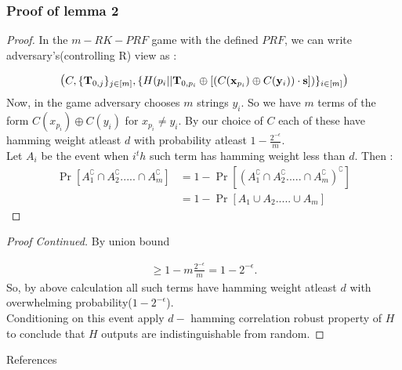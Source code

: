 \documentclass[hyperref={pdfpagelabels=false}]{beamer}
\theoremstyle{remark}
\begin{document}
\begin{frame}
\frametitle{Proof of lemma 2}
\begin{proof}\renewcommand{\qedsymbol}{}
In the $m-RK-PRF$ game with the defined $PRF$, we can write adversary's(controlling R) view as : 

\begin{equation}
\mathlarger{(} C, \{\mathbf{T}_{0,j}\}_{j \in [m]}, \{H(p_i ||\mathbf{T}_{0,p_i} \oplus [(C(\mathbf{x}_{p_i} ) \oplus C(\mathbf{y}_{i})) \cdot \mathbf{s}]  )\}_{i \in [m]} \mathlarger{)}
\end{equation}\pause
Now, in the game adversary chooses $m$ strings $y_i$. So we have $m$ terms of the form $C(x_{p_i}) \oplus C(y_i)$ for $x_{p_i} \neq y_i$. \pause
By our choice of $C$ each of these have hamming weight atleast $d$ with probability atleast $1-\frac{2^{-\epsilon}}{m}$.\\\pause
Let $A_i$ be the event when $i^th$ such term has hamming weight less than $d$. Then :\pause
\begin{align*}
\Pr \left[ A_1^\complement \cap A_2^\complement..... \cap A_m^\complement \right] &= 1 - \Pr \left[ (A_1^\complement \cap A_2^\complement..... \cap A_m^\complement)^\complement \right] \\
&= 1 - \Pr \left[  A_1 \cup A_2..... \cup A_m \right]
\end{align*}


\end{proof}
\end{frame}

\begin{frame}
\begin{proof}[Proof Continued]
By union bound

\begin{align*}
 \geq 1 - m \frac{2^{-\epsilon}}{m} = 1 - 2^{-\epsilon}.
\end{align*}\pause
So, by above calculation all such terms have hamming weight atleast $d$ with overwhelming probability($1 - 2^{-\epsilon}$).\\\pause
Conditioning on this event apply $d-$ hamming correlation robust property of $H$ to conclude that $H$ outputs are indistinguishable from random. 
\end{proof}
\end{frame}


\begin{center}
\vspace*{0.5px}
\huge{References}
\end{center}\par


\end{document}
